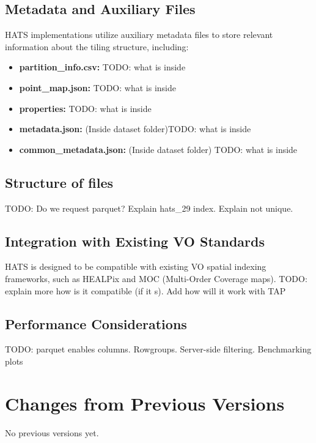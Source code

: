 \documentclass[11pt,a4paper]{ivoa}
\begin{document}
    \subsection{Metadata and Auxiliary Files}
    HATS implementations utilize auxiliary metadata files to store relevant information about the tiling structure, including:
    \begin{itemize}
         \item \textbf{partition\_info.csv:} TODO: what is inside
        \item \textbf{point\_map.json:} TODO: what is inside
        \item \textbf{properties:} TODO: what is inside
        \item \textbf{metadata.json:} (Inside dataset folder)TODO: what is inside
        \item \textbf{common\_metadata.json:}  (Inside dataset folder) TODO: what is inside
    \end{itemize}
    
     \subsection{Structure of files} 
	TODO: Do we request parquet? Explain hats\_29 index. Explain not unique. 

    \subsection{Integration with Existing VO Standards}
    HATS is designed to be compatible with existing VO spatial indexing frameworks, such as HEALPix and MOC (Multi-Order Coverage maps). TODO: explain more how is it compatible (if it s). Add how will it work with TAP

    \subsection{Performance Considerations}
TODO: parquet enables columns. Rowgroups. Server-side filtering. Benchmarking plots

\appendix
\section{Changes from Previous Versions}
No previous versions yet.


\end{document}
